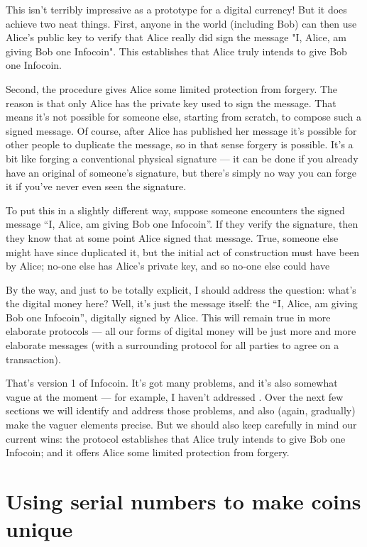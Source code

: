 \documentclass[12pt]{book}
\newcounter{problem}[chapter]
\newcounter{example}[chapter]
\begin{document}
This isn't terribly impressive as a prototype for a digital currency!
But it does achieve two neat things.  First, anyone in the world
(including Bob) can then use Alice's public key to verify that Alice
really did sign the message "I, Alice, am giving Bob one Infocoin".
This establishes that Alice truly intends to give Bob one Infocoin.

Second, the procedure gives Alice some limited protection from
forgery.  The reason is that only Alice has the private key used to
sign the message.  That means it's not possible for someone else,
starting from scratch, to compose such a signed message. Of course,
after Alice has published her message it's possible for other people
to duplicate the message, so in that sense forgery is possible.  It's
a bit like forging a conventional physical signature --- it can be
done if you already have an original of someone's signature, but
there's simply no way you can forge it if you've never even seen the
signature.

To put this in a slightly different way, suppose someone encounters
the signed message ``I, Alice, am giving Bob one Infocoin''.  If they
verify the signature, then they know that at some point Alice signed
that message.  True, someone else might have since duplicated it, but
the initial act of construction must have been by Alice; no-one else
has Alice's private key, and so no-one else could have 

By the way, and just to be totally explicit, I should address the
question: what's the digital money here?  Well, it's just the message
itself: the ``I, Alice, am giving Bob one Infocoin'', digitally signed
by Alice.  This will remain true in more elaborate protocols --- all
our forms of digital money will be just more and more elaborate
messages (with a surrounding protocol for all parties to agree on a
transaction).

That's version 1 of Infocoin.  It's got many problems, and it's also
somewhat vague at the moment --- for example, I haven't addressed .
Over the next few sections we will identify and address those
problems, and also (again, gradually) make the vaguer elements
precise.  But we should also keep carefully in mind our current wins:
the protocol establishes that Alice truly intends to give Bob one
Infocoin; and it offers Alice some limited protection from forgery.

\section{Using serial numbers to make coins unique}
\end{document}
